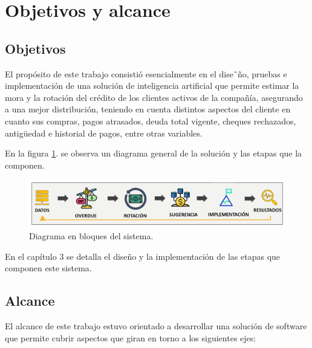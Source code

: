 
\section{Objetivos y alcance}

\subsection{Objetivos}

El propósito de este trabajo consistió esencialmente en el dise˜ño, pruebas e implementación de una solución de inteligencia artificial que permite estimar la mora
y la rotación del crédito de los clientes activos de la compañía, asegurando a una mejor distribución, teniendo en cuenta distintos aspectos del cliente en cuanto sus compras, pagos atrasados, deuda total vigente, cheques rechazados, antigüedad e historial de pagos, entre otras variables.

En la figura \ref{fig:Diagrama en bloques del sistema}.  se observa un diagrama general de la solución y las etapas que la componen.

\vspace{1cm}

\begin{figure}[htbp]
	\centering
	\includegraphics[width=1.0\textwidth]{./Figures/Diagrama de FlujoV2.png}
	\caption{Diagrama en bloques del sistema.}
	\label{fig:Diagrama en bloques del sistema}
\end{figure}

\vspace{1cm}

En el capítulo 3 se detalla el diseño y la implementación de las etapas que componen este sistema.



\subsection{Alcance}


El alcance de este trabajo estuvo orientado a desarrollar una solución de software que permite cubrir aspectos que giran en torno a los siguientes ejes:

